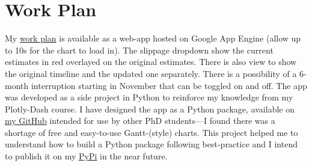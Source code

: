 \section{Work Plan}

My \href{https://phd-gantt-chart.de.r.appspot.com/}{work plan} is available as a web-app hosted on Google App Engine (allow up to 10s for the chart to load in). The slippage dropdown show the current estimates in red overlayed on the original estimates. There is also view to show the original timeline and the updated one separately. There is a possibility of a 6-month interruption starting in November that can be toggled on and off. The app was developed as a side project in Python to reinforce my knowledge from my Plotly-Dash course. I have designed the app as a Python package, available on \href{https://github.com/carrowmw/phd-gantt-chart}{my GitHub} intended for use by other PhD students---I found there was a shortage of free and easy-to-use Gantt-(style) charts. This project helped me to understand how to build a Python package following best-practice and I intend to publish it on my \href{https://pypi.org/user/carrowmw/}{PyPi} in the near future.